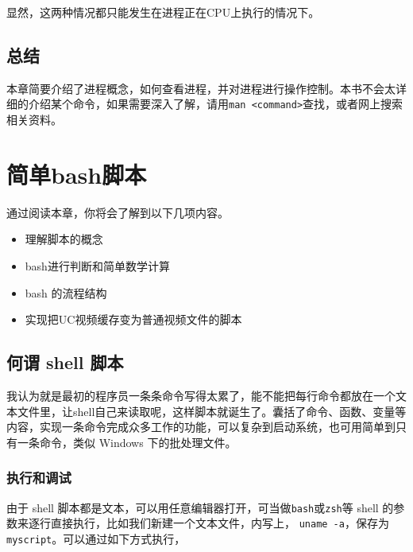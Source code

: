 \documentclass[doctor,openright,twoside]{sjtuthesis}
\providecommand{\tightlist}{%
    \setlength{\itemsep}{0pt}\setlength{\parskip}{0pt}}
\newcommand{\passthrough}[1]{#1}
\theoremstyle{plain}
\theoremstyle{definition}
\theoremstyle{remark}
\theoremstyle{ocrenumbox}
\theoremstyle{plain}
\begin{document}
显然，这两种情况都只能发生在进程正在CPU上执行的情况下。

\hypertarget{section-101}{%
\section{总结}\label{section-101}}

本章简要介绍了进程概念，如何查看进程，并对进程进行操作控制。本书不会太详细的介绍某个命令，如果需要深入了解，请用\passthrough{\lstinline!man <command>!}查找，或者网上搜索相关资料。

\hypertarget{chap:simple-bash-scripts}{%
\chapter{简单bash脚本}\label{chap:simple-bash-scripts}}

通过阅读本章，你将会了解到以下几项内容。

\begin{itemize}
\tightlist
\item
  理解脚本的概念
\item
  bash进行判断和简单数学计算
\item
  bash 的流程结构
\item
  实现把UC视频缓存变为普通视频文件的脚本
\end{itemize}

\hypertarget{shell--2}{%
\section{何谓 shell 脚本}\label{shell--2}}

我认为就是最初的程序员一条条命令写得太累了，能不能把每行命令都放在一个文本文件里，让shell自己来读取呢，这样脚本就诞生了。囊括了命令、函数、变量等内容，实现一条命令完成众多工作的功能，可以复杂到启动系统，也可用简单到只有一条命令，类似 Windows 下的批处理文件。

\hypertarget{section-102}{%
\subsection{执行和调试}\label{section-102}}

由于 shell 脚本都是文本，可以用任意编辑器打开，可当做\passthrough{\lstinline!bash!}或\passthrough{\lstinline!zsh!}等 shell 的参数来逐行直接执行，比如我们新建一个文本文件，内写上，
\passthrough{\lstinline!uname -a!}，保存为\passthrough{\lstinline!myscript!}。可以通过如下方式执行，
\lstset{mathescape=true}
\end{document}
